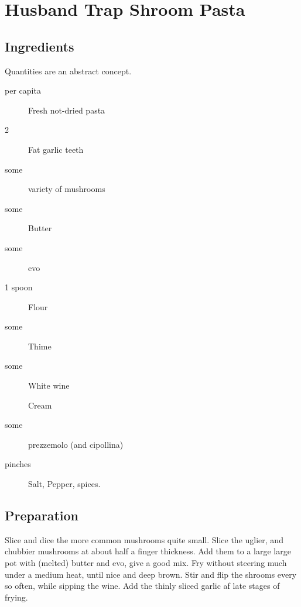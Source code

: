 \setchapterpreamble[u]{\margintoc}
\chapter{Husband Trap Shroom Pasta}

\section{Ingredients}
Quantities are an abstract concept.

\begin{multicols}{2}
	\begin{description}
		\item[per capita] Fresh not-dried pasta
		\item[2] Fat garlic teeth
		\item[some] variety of mushrooms
		\item[some] Butter
		\item[some] \gls{evo}
		\item[1 spoon] Flour
		\item[some] Thime
		\item[some] White wine
		\item[] Cream
		\item[some] prezzemolo (and cipollina)
		\item[pinches] Salt, Pepper, spices.
	\end{description}
\end{multicols}

\section{Preparation}

Slice and dice the more common mushrooms quite small. Slice the uglier, and chubbier mushrooms at about half a finger thickness. Add them to a large large pot with (melted) butter and \gls{evo}, give a good mix.
%
Fry without steering much under a medium heat, until nice and deep brown.
%
Stir and flip the shrooms every so often, while sipping the wine.
%
Add the thinly sliced garlic af late stages of frying. 


